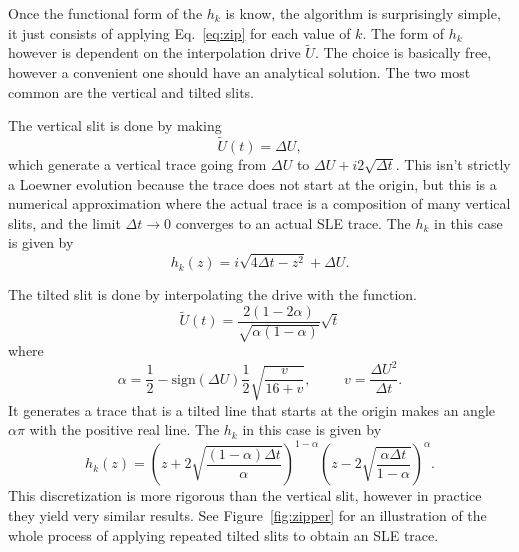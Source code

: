 Once the functional form of the $h_k$ is know, the algorithm is surprisingly
simple, it just consists of applying Eq.~\ref{eq:zip} for each value of $k$.
The form of $h_k$ however is dependent on the interpolation drive $\tilde{U}$.
The choice is basically free, however a convenient one should have an
analytical solution. The two most common are the vertical and tilted slits.

The vertical slit is done by making
\begin{equation}
    \tilde{U}(t)=\Delta U,
\end{equation}
which generate a vertical trace going from $\Delta U$ to $\Delta U +
i2\sqrt{\Delta t}$. This isn't strictly a Loewner evolution because the trace
does not start at the origin, but this is a numerical approximation where the
actual trace is a composition of many vertical slits, and the limit $\Delta t
\rightarrow 0$ converges to an actual SLE trace. The $h_k$ in this case is
given by~\cite{Kager2004b}
\begin{equation}
    \label{eq:vslit}
    h_{k}(z)=i\sqrt{4\Delta t-z^{2}}+\Delta U.
\end{equation}

The tilted slit is done by interpolating the drive with the function.
\begin{equation}
    \tilde{U}(t)=
        \frac{2\left(1-2\alpha\right)}
             {\sqrt{\alpha\left(1-\alpha\right)}}
        \sqrt{t}
\end{equation}
where
\begin{equation}
    \alpha=\frac{1}{2}-
    \mbox{sign}\left(\Delta U\right)\frac{1}{2}\sqrt{\frac{v}{16+v}},
    \,\,\,\,\,\,\,\,\,\,\,\,\,\,
    v=\frac{\Delta U^{2}}{\Delta t}.
\end{equation}
It generates a trace that is a tilted line that starts at the origin makes an
angle $\alpha\pi$ with the positive real line. The $h_k$ in this case is
given by
\begin{equation}
    h_{k}(z) = 
    {\left(
        z+2\sqrt{\frac{\left(1-\alpha\right)\Delta t}{\alpha}}
    \right)}^{1-\alpha}
    {\left(
        z-2\sqrt{\frac{\alpha\Delta t}{1-\alpha}}
    \right)}^{\alpha}.
\end{equation}
This discretization is more rigorous than the vertical slit, however in
practice they yield very similar results. See Figure~\ref{fig:zipper} for an
illustration of the whole process of applying repeated tilted slits to obtain
an SLE trace.


